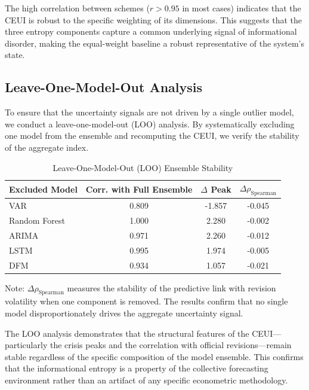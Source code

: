 \documentclass[12pt,a4paper]{article}
\theoremstyle{remark}
\begin{document}
The high correlation between schemes ($r > 0.95$ in most cases) indicates that the CEUI is robust to the specific weighting of its dimensions. This suggests that the three entropy components capture a common underlying signal of informational disorder, making the equal-weight baseline a robust representative of the system's state.

\subsection{Leave-One-Model-Out Analysis}

To ensure that the uncertainty signals are not driven by a single outlier model, we conduct a leave-one-model-out (LOO) analysis. By systematically excluding one model from the ensemble and recomputing the CEUI, we verify the stability of the aggregate index.

\begin{table}[h]
\centering
\begin{threeparttable}
\caption{Leave-One-Model-Out (LOO) Ensemble Stability}
\label{tab:robustness_loo}
\begin{tabular}{lccc}
\toprule
Excluded Model & Corr. with Full Ensemble & $\Delta$ Peak & $\Delta \rho_{\text{Spearman}}$ \\
\midrule
VAR & 0.809 & -1.857 & -0.045 \\
Random Forest & 1.000 & 2.280 & -0.002 \\
ARIMA & 0.971 & 2.260 & -0.012 \\
LSTM & 0.995 & 1.974 & -0.005 \\
DFM & 0.934 & 1.057 & -0.021 \\
\bottomrule
\end{tabular}
\begin{tablenotes}
  \small \item Note: $\Delta \rho_{\text{Spearman}}$ measures the stability of the predictive link with revision volatility when one component is removed. The results confirm that no single model disproportionately drives the aggregate uncertainty signal.
\end{tablenotes}
\end{threeparttable}
\end{table}

The LOO analysis demonstrates that the structural features of the CEUI—particularly the crisis peaks and the correlation with official revisions—remain stable regardless of the specific composition of the model ensemble. This confirms that the informational entropy is a property of the collective forecasting environment rather than an artifact of any specific econometric methodology.
\end{document}
